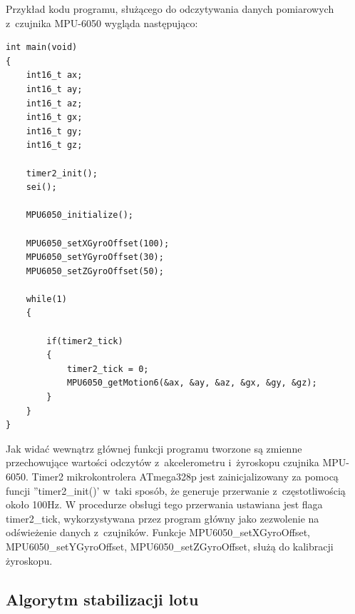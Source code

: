 Przykład kodu programu, służącego do odczytywania danych pomiarowych z~czujnika MPU-6050 wygląda następująco:

\begin{lstlisting}
int main(void)
{
	int16_t ax;
	int16_t ay;
	int16_t az;
	int16_t gx;
	int16_t gy;
	int16_t gz;

	timer2_init();
	sei();

	MPU6050_initialize();

	MPU6050_setXGyroOffset(100);
	MPU6050_setYGyroOffset(30);
	MPU6050_setZGyroOffset(50);

	while(1)
	{
		
		if(timer2_tick)
		{
			timer2_tick = 0;
			MPU6050_getMotion6(&ax, &ay, &az, &gx, &gy, &gz);
		}
	}
}
\end{lstlisting}

Jak widać wewnątrz głównej funkcji programu tworzone są zmienne przechowujące wartości odczytów z~akcelerometru i~żyroskopu czujnika MPU-6050. Timer2 mikrokontrolera ATmega328p jest zainicjalizowany za pomocą funcji ''timer2\_init()' w~taki sposób, że generuje przerwanie z~częstotliwością około 100Hz. W procedurze obsługi tego przerwania ustawiana jest flaga timer2\_tick, wykorzystywana przez program główny jako zezwolenie na odświeżenie danych z~czujników. Funkcje MPU6050\_setXGyroOffset, MPU6050\_setYGyroOffset, MPU6050\_setZGyroOffset, służą do kalibracji żyroskopu.

\subsection{Algorytm stabilizacji lotu}

